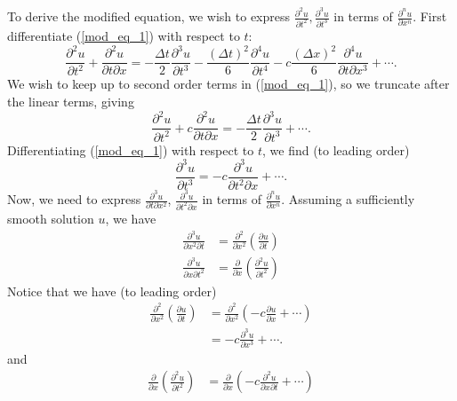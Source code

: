 \documentclass{article}
\begin{document}
\begin{itemize}
\begin{equation}
    \end{equation}
    To derive the modified equation, we wish to express $\frac{\partial^2u}{\partial t^2}, \frac{\partial^3u}{\partial t^3}$ in terms of $\frac{\partial^nu}{\partial x^n}$. First differentiate (\ref{mod_eq_1}) with respect to $t$:
    \[
        \frac{\partial^2u}{\partial t^2} + \frac{\partial^2u}{\partial t\partial x} = -\frac{\Delta t}{2}\frac{\partial^3u}{\partial t^3} - \frac{(\Delta t)^2}{6}\frac{\partial^4u}{\partial t^4} - c\frac{(\Delta x)^2}{6}\frac{\partial^4u}{\partial t\partial x^3} + \cdots.
    \]
    We wish to keep up to second order terms in (\ref{mod_eq_1}), so we truncate after the linear terms, giving
    \begin{equation}
        \label{mod_eq_2}
        \frac{\partial^2u}{\partial t^2} + c\frac{\partial^2u}{\partial t\partial x} = -\frac{\Delta t}{2}\frac{\partial^3u}{\partial t^3} + \cdots.
    \end{equation}
    Differentiating (\ref{mod_eq_1}) with respect to $t$, we find (to leading order)
    \begin{equation}
        \frac{\partial^3u}{\partial t^3} = -c\frac{\partial^3u}{\partial t^2\partial x} + \cdots.
    \end{equation}
    Now, we need to express $\frac{\partial^3u}{\partial t\partial x^2}$, $\frac{\partial^3u}{\partial t^2 \partial x}$ in terms of $\frac{\partial^nu}{\partial x^n}$. Assuming a sufficiently smooth solution $u$, we have
    \begin{align*}
        \frac{\partial^3u}{\partial x^2\partial t} &= \frac{\partial^2}{\partial x^2}\left(\frac{\partial u}{\partial t}\right)\\
        \frac{\partial^3u}{\partial x\partial t^2} &= \frac{\partial }{\partial x}\left(\frac{\partial^2 u}{\partial t^2}\right)
    \end{align*}
    Notice that we have (to leading order)
    \begin{align*}
        \frac{\partial^2}{\partial x^2}\left(\frac{\partial u}{\partial t}\right) &= \frac{\partial^2}{\partial x^2}\left(-c\frac{\partial u}{\partial x} + \cdots\right)\\
        &= -c\frac{\partial^3u}{\partial x^3} + \cdots.
    \end{align*}
    and
    \begin{align*}
        \frac{\partial}{\partial x}\left(\frac{\partial^2 u}{\partial t^2}\right) &= \frac{\partial }{\partial x}\left(-c\frac{\partial^2u}{\partial x\partial t} + \cdots\right)\\

\end{align*}
\end{itemize}
\end{document}
